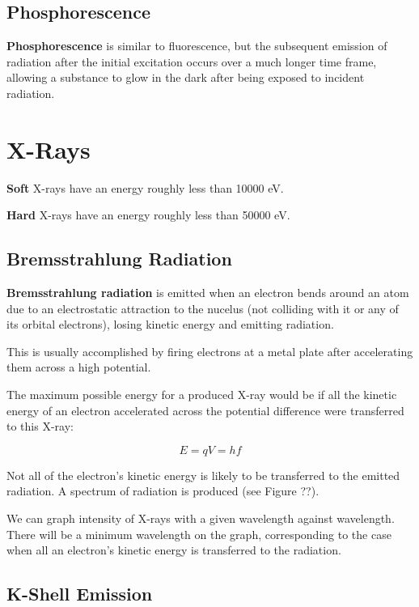 \documentclass[a4paper,11pt]{report}
\begin{document}
\subsection{Phosphorescence}

\textbf{Phosphorescence} is similar to fluorescence, but the subsequent emission
of radiation after the initial excitation occurs over a much longer time frame,
allowing a substance to glow in the dark after being exposed to incident
radiation.


\section{X-Rays}

\textbf{Soft} X-rays have an energy roughly less than 10000 eV.

\textbf{Hard} X-rays have an energy roughly less than 50000 eV.

\subsection{Bremsstrahlung Radiation}



\textbf{Bremsstrahlung radiation} is emitted when an electron bends around an
atom due to an electrostatic attraction to the nucelus (not colliding with it
or any of its orbital electrons), losing kinetic energy and emitting radiation.

This is usually accomplished by firing electrons at a metal plate after
accelerating them across a high potential.

The maximum possible energy for a produced X-ray would be if all the kinetic
energy of an electron accelerated across the potential difference were
transferred to this X-ray:

$$
E = qV = hf
$$

Not all of the electron's kinetic energy is likely to be transferred to the
emitted radiation. A spectrum of radiation is produced (see Figure ??).

We can graph intensity of X-rays with a given wavelength against wavelength.
There will be a minimum wavelength on the graph, corresponding to the case when
all an electron's kinetic energy is transferred to the radiation.

\subsection{K-Shell Emission}
\end{document}
